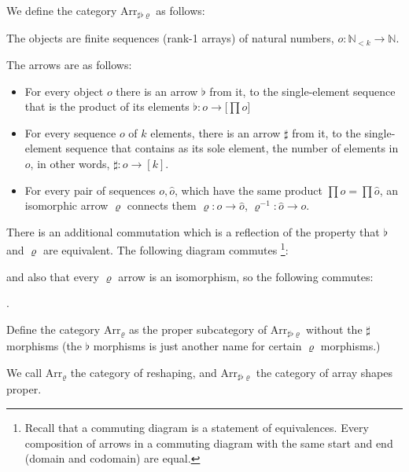 \documentclass{DIKU-report-variant}
\newcommand\mrm[1]{\mathrm{#1}}
\newcommand\brm[1]{\bm{\mrm{#1}}}
\newcommand\Nat{\mathbb{N}}
\newcommand\Arr[1]{{\brm{Arr}_{\brm{#1}}}}
\newcommand\SFR{\sharp\flat\varrho}
\begin{document}
\begin{definition}
  \label{def:category-of-shapes}
  We define the category \(\Arr\SFR\) as follows:

  The objects are finite sequences (rank-1 arrays)
  of natural numbers, \(o : \Nat_{<k} \to \Nat\).

  The arrows are as follows:
  \begin{itemize}
    \item For every object \(o\)
      there is an arrow \(\flat\) from it, to the single-element sequence
      that is the product of its elements \(\flat : o \to \big[ \prod o \big]\)
    \item For every sequence \(o\) of \(k\) elements,
      there is an arrow \(\sharp\) from it, to the single-element sequence
      that contains as its sole element, the number of elements in \(o\), in
      other words, \(\sharp : o \to [k]\).
    \item For every pair of sequences \(o, \hat o\), which have the same product
      \(\prod o = \prod \hat o\), an isomorphic arrow \(\varrho\) connects them
      \( \varrho : o \to \hat o\), \(\varrho^{-1} : \hat o \to o\).
  \end{itemize}

  There is an additional commutation which is a reflection of the
  property that \(\flat\) and \(\varrho\) are equivalent.
  The following diagram commutes
    \footnote{Recall that a commuting diagram is a statement of equivalences. Every composition
    of arrows in a commuting diagram with the same start and end (domain and codomain) are equal.}:
  \begin{center}
  \end{center}
  and also that every \(\varrho\) arrow is an isomorphism, so the following commutes:
  \begin{center}
  .
  \end{center}

  Define the category \(\Arr\varrho\) as the proper subcategory of \(\Arr\SFR\) without the
  \(\sharp\) morphisms (the \(\flat\) morphisms is just another name for certain \(\varrho\) morphisms.)

  We call \(\Arr\varrho\) the category of reshaping, and \(\Arr\SFR\) the category of array
  shapes proper.
\end{definition}
\end{document}
